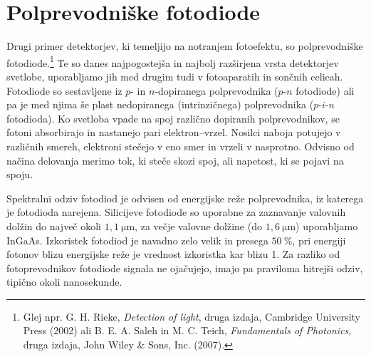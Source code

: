 \section{Polprevodniške fotodiode}
Drugi primer detektorjev, ki temeljijo na notranjem fotoefektu,
so polprevodniške fotodiode.\footnote{Glej npr. 
G. H. Rieke, {\it Detection of light}, druga izdaja, Cambridge University Press (2002) ali
B. E. A. Saleh in M. C. Teich, {\it Fundamentals of Photonics}, druga izdaja, John Wiley \& Sons, Inc. (2007).}
Te so danes najpogostejša in najbolj razširjena vrsta detektorjev svetlobe, uporabljamo jih med
drugim tudi v fotoaparatih in sončnih celicah. Fotodiode so sestavljene iz $p$- in $n$-dopiranega 
polprevodnika ($p$-$n$ fotodiode) ali pa je med njima še plast nedopiranega (intrinzičnega) 
polprevodnika ($p$-$i$-$n$ fotodioda). Ko svetloba vpade na spoj različno dopiranih polprevodnikov,
se fotoni absorbirajo in nastanejo 
pari elektron--vrzel. Nosilci naboja potujejo v različnih smereh, elektroni stečejo v eno smer in
vrzeli v nasprotno. Odvisno od načina delovanja merimo tok, ki steče skozi 
spoj, ali napetost, ki se pojavi na spoju. 

Spektralni odziv 
fotodiod je odvisen od energijske reže polprevodnika, 
iz katerega je fotodioda narejena.
Silicijeve  fotodiode so  uporabne za zaznavanje valovnih dolžin do največ okoli
$1,1~\si{\micro\meter}$, za večje valovne dolžine (do $1,6~\si{\micro\meter}$) 
uporabljamo InGaAs. Izkoristek fotodiod
je navadno zelo velik in presega $50~\%$, pri energiji fotonov blizu energijske reže 
je vrednost izkoristka kar blizu 1.
Za razliko od fotoprevodnikov fotodiode signala
ne ojačujejo, imajo pa praviloma hitrejši odziv, tipično okoli nanosekunde.

